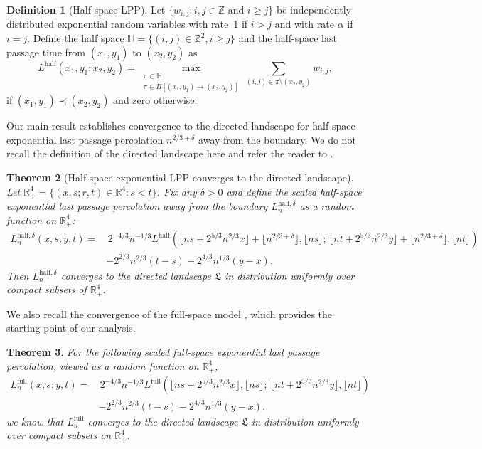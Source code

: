 \documentclass[11pt]{article}
\newtheorem{theorem}{Theorem}[section]
\theoremstyle{definition}
\newtheorem{definition}[theorem]{Definition}
\newcommand{\R}{\mathbb{R}}
\newcommand{\Z}{\mathbb{Z}}
\newcommand{\HH}{\mathbb{H}}
\newcommand{\Lfull}{L^{\mathrm{full}}}
\newcommand{\Lhalf}{L^{\mathrm{half}}}
\newcommand{\LLL}{\mathfrak{L}}
\begin{document}
\begin{definition}[Half-space LPP]
Let $\{w_{i,j}: i,j \in \Z \text{ and } i \geq j\}$ be independently distributed exponential random variables with rate~1 if $i > j$ and with rate $\alpha$ if $i = j$. Define the half space $\HH = \{(i,j) \in \Z^2, i \geq j\}$ and the half-space last passage time from $(x_1,y_1)$ to $(x_2,y_2)$ as
\[
\Lhalf(x_1,y_1;x_2,y_2) = \max_{\substack{ \pi \subset \HH \\\pi \in \Pi[(x_1,y_1)\to(x_2,y_2)]}} \sum_{(i,j)\in\pi \setminus (x_2,y_2)} w_{i,j},
\]
if $(x_1, y_1) \prec (x_2,y_2)$ and zero otherwise.
\end{definition}

Our main result establishes convergence to the directed landscape for
half-space exponential last passage percolation $n^{2/3+\delta}$ away from the boundary. We do not recall the definition of the directed landscape here and refer
the reader to \cite{dauvergne2022directed}.

\begin{theorem}[Half-space exponential LPP converges to the directed landscape]
\label{thm_half_to_DL}
Let $\R_+^4 = \{(x,s;r,t) \in \R^4: s<t\}$. Fix any $\delta>0$ and define the scaled half-space exponential last passage
percolation away from the boundary $L^{\mathrm{half},\delta}_n$ as a random function
on $\R_+^4$:
\begin{equation}\label{eq:Lhalfk_def}
\begin{split}
L^{\mathrm{half},\delta}_n(x,s;y,t)
=&\,2^{-4/3}n^{-1/3}\Lhalf(\lfloor ns+2^{5/3}n^{2/3}x\rfloor
+ \lfloor n^{2/3+\delta} \rfloor,\lfloor ns\rfloor;\,
\lfloor nt+2^{5/3}n^{2/3}y\rfloor+\lfloor n^{2/3+\delta} \rfloor,\lfloor nt\rfloor)\\
&-2^{2/3}n^{2/3}(t-s)-2^{4/3}n^{1/3}(y-x).
\end{split}
\end{equation}
Then $L^{\mathrm{half},\delta}_n$ converges to the directed landscape $\LLL$ in
distribution uniformly over compact subsets of $\R_+^4$.
\end{theorem}

We also recall the convergence of the full-space model \cite[Theorem 12.1]{dauv-vir-lis}, which provides the starting point of our analysis.

\begin{theorem}\label{thm_ELPP_to_DL}
For the following scaled full-space exponential last passage percolation, viewed as a random function on $\R_+^4$,
\begin{equation}\label{eq:Lhalfk_def}
\begin{split}
L^{\mathrm{full}}_n(x,s;y,t)
=&\,2^{-4/3}n^{-1/3}\Lfull(\lfloor ns+2^{5/3}n^{2/3}x\rfloor
,\lfloor ns\rfloor;\,
\lfloor nt+2^{5/3}n^{2/3}y\rfloor,\lfloor nt\rfloor)\\
&-2^{2/3}n^{2/3}(t-s)-2^{4/3}n^{1/3}(y-x).
\end{split}
\end{equation}
we know that $\Lfull_n$ converges to the directed landscape $\LLL$ in distribution uniformly over compact subsets on $\R_+^4$.
\end{theorem}
\end{document}
